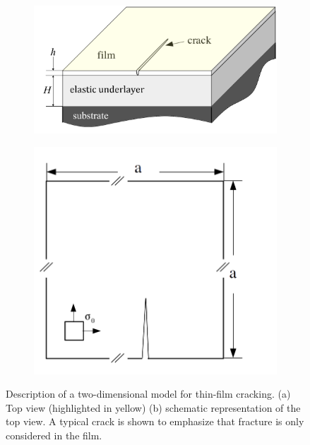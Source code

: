 \begin{figure}[htb!]
  \centering
  \begin{subfigure}[b]{0.35\textwidth}
    \centering
    \includegraphics[width=\textwidth,scale=0.5]{Chapter4/figures/2D/top_view.png}
    \caption{}
  \end{subfigure}
  \hspace{0.1\textwidth}
  \begin{subfigure}[b]{0.3\textwidth}
    \centering
    \includegraphics[width=\textwidth,scale=0.5]{Chapter4/figures/2D/2D_schematic.png}
    \caption{}
  \end{subfigure}
  \caption{Description of a two-dimensional model for thin-film cracking. (a) Top view (highlighted in yellow) (b) schematic representation of the top view. A typical crack is shown to emphasize that fracture is only considered in the film. }
  \label{fig: Chapter4/2D/simplification}
\end{figure}
